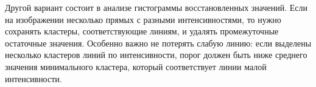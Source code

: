Другой вариант состоит в анализе гистограммы восстановленных значений. Если
на изображении несколько прямых с разными интенсивностями, то нужно сохранять
кластеры, соответствующие линиям, и удалять промежуточные остаточные значения.
Особенно важно не потерять слабую линию: если выделены несколько кластеров
линий по интенсивности, порог должен быть ниже среднего значения минимального
кластера, который соответствует линии малой интенсивности.

